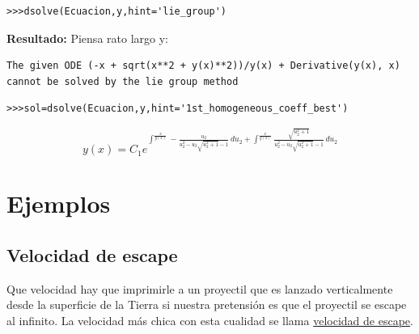 \documentclass{article}
\begin{document}
\begin{lstlisting}
>>>dsolve(Ecuacion,y,hint='lie_group')
\end{lstlisting}

 \noindent\textbf{Resultado:} Piensa rato largo y:
\begin{lstlisting}
The given ODE (-x + sqrt(x**2 + y(x)**2))/y(x) + Derivative(y(x), x) 
cannot be solved by the lie group method
\end{lstlisting}


\begin{lstlisting}
>>>sol=dsolve(Ecuacion,y,hint='1st_homogeneous_coeff_best')
\end{lstlisting}

\[y{\left (x \right )} = C_{1} e^{\int^{\frac{x}{y{\left (x \right )}}} -\frac{u_{2}}{u_{2}^{2} - u_{2} \sqrt{u_{2}^{2} + 1} - 1}\, du_{2} + \int^{\frac{x}{y{\left (x \right )}}} \frac{\sqrt{u_{2}^{2} + 1}}{u_{2}^{2} - u_{2} \sqrt{u_{2}^{2} + 1} - 1}\, du_{2}}\]



\section{Ejemplos}


\subsection{Velocidad de escape}\label{pag:vel_esc}



\begin{problema} Que velocidad hay que imprimirle a un proyectil que es lanzado verticalmente desde la superficie de la Tierra si nuestra pretensión
es que el proyectil se escape al infinito. La velocidad más chica con esta cualidad se llama 
\href{http://es.wikipedia.org/wiki/Velocidad_de_escape}{velocidad de escape}.
\end{problema}
\end{document}
